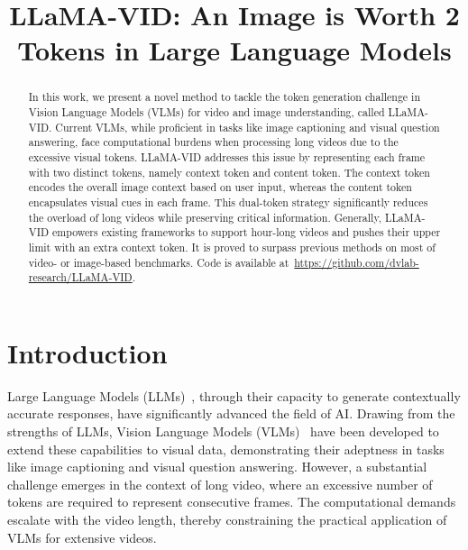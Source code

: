 \title{LLaMA-VID: An Image is Worth 2 Tokens in Large Language Models}



\maketitle

\begin{abstract}
In this work, we present a novel method to tackle the token generation challenge in Vision Language Models (VLMs) for video and image understanding, called LLaMA-VID. 
Current VLMs, while proficient in tasks like image captioning and visual question answering, face computational burdens when processing long videos due to the excessive visual tokens. 
LLaMA-VID addresses this issue by representing each frame with two distinct tokens, namely context token and content token. 
The context token encodes the overall image context based on user input, whereas the content token encapsulates visual cues in each frame. 
This dual-token strategy significantly reduces the overload of long videos while preserving critical information. 
Generally, LLaMA-VID empowers existing frameworks to support hour-long videos and pushes their upper limit with an extra context token. 
It is proved to surpass previous methods on most of video- or image-based benchmarks. 
Code is available at~\href{https://github.com/dvlab-research/LLaMA-VID}{https://github.com/dvlab-research/LLaMA-VID}.

\end{abstract}

\section{Introduction}
Large Language Models (LLMs)~\cite{ChatGPT,zhang2022opt,llama}, through their capacity to generate contextually accurate responses, have significantly advanced the field of AI.
Drawing from the strengths of LLMs, Vision Language Models (VLMs)~\cite{instructblip,llava,GPT4} have been developed to extend these capabilities to visual data, demonstrating their adeptness in tasks like image captioning and visual question answering. 
However, a substantial challenge emerges in the context of long video, where an excessive number of tokens are required to represent consecutive frames. 
The computational demands escalate with the video length, thereby constraining the practical application of VLMs for extensive videos.

